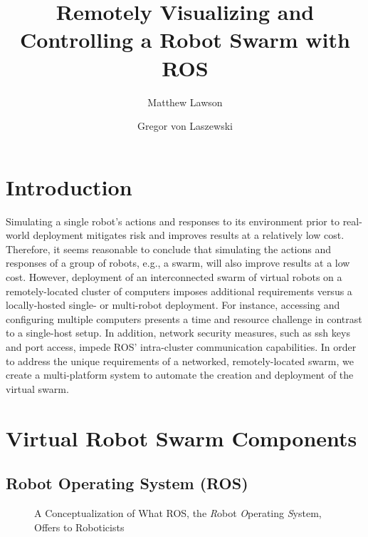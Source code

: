 \documentclass[9pt,twocolumn,twoside]{../../styles/osajnl}
\title{Remotely Visualizing and Controlling a Robot Swarm with ROS}
\author[1]{Matthew Lawson}
\author[1,*]{Gregor von Laszewski}
\affil[1]{School of Informatics and Computing, Bloomington, IN 47408, U.S.A.}
\affil[*]{Corresponding authors: laszewski@gmail.com}
\begin{document}
\maketitle

\section{Introduction}
Simulating a single robot's actions and responses to its environment prior to real-world deployment mitigates risk and improves results at a relatively low cost. Therefore, it seems reasonable to conclude that simulating the actions and responses of a group of robots, e.g., a swarm, will also improve results at a low cost.  However, deployment of an interconnected swarm of virtual robots on a remotely-located cluster of computers imposes additional requirements versus a locally-hosted single- or multi-robot deployment.  For instance, accessing and configuring multiple computers presents a time and resource challenge in contrast to a single-host setup.  In addition, network security measures, such as ssh keys and port access, impede ROS' intra-cluster communication capabilities.  In order to address the unique requirements of a networked, remotely-located swarm, we create a multi-platform system to automate the creation and deployment of the virtual swarm. 

\section{Virtual Robot Swarm Components}
\subsection{Robot Operating System (ROS)} %

\begin{figure}[htbp]
\centering
{}
\caption{A Conceptualization of What ROS, the \textit{R}obot \textit{O}perating \textit{S}ystem, Offers to Roboticists \cite{www-ros-ros-is}}
\label{fig:rosOverview}
\end{figure}
\end{document}
